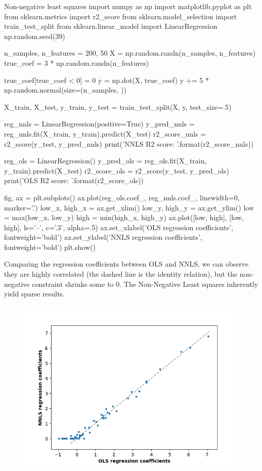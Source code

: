 \begin{py}{Non-negative least squares}
import numpy as np
import matplotlib.pyplot as plt
from sklearn.metrics import r2_score
from sklearn.model_selection import train_test_split
from sklearn.linear_model import LinearRegression
np.random.seed(39)

n_samples, n_features = 200, 50
X = np.random.randn(n_samples, n_features)
true_coef = 3 * np.random.randn(n_features)

true_coef[true_coef < 0] = 0
y = np.dot(X, true_coef)
y += 5 * np.random.normal(size=(n_samples, ))

X_train, X_test, y_train, y_test = train_test_split(X, y, test_size=.5)

reg_nnls = LinearRegression(positive=True)
y_pred_nnls = reg_nnls.fit(X_train, y_train).predict(X_test)
r2_score_nnls = r2_score(y_test, y_pred_nnls)
print('NNLS R2 score: {}'.format(r2_score_nnls))

reg_ols = LinearRegression()
y_pred_ols = reg_ols.fit(X_train, y_train).predict(X_test)
r2_score_ols = r2_score(y_test, y_pred_ols)
print('OLS R2 score: {}'.format(r2_score_ols))

fig, ax = plt.subplots()
ax.plot(reg_ols.coef_, reg_nnls.coef_, linewidth=0, marker='.')
low_x, high_x = ax.get_xlim()
low_y, high_y = ax.get_ylim()
low = max(low_x, low_y)
high = min(high_x, high_y)
ax.plot([low, high], [low, high], ls='--', c='.3', alpha=.5)
ax.set_xlabel('OLS regression coefficients', fontweight='bold')
ax.set_ylabel('NNLS regression coefficients', fontweight='bold')
plt.show()
\end{py}

Comparing the regression coefficients between OLS and NNLS, we can observe they are highly correlated (the dashed line is the identity relation), but the non-negative constraint shrinks some to 0. The Non-Negative Least squares inherently yield sparse results.
\begin{figure}
\centering
\includegraphics{img/Non-negative least squares.png}

\end{figure}

